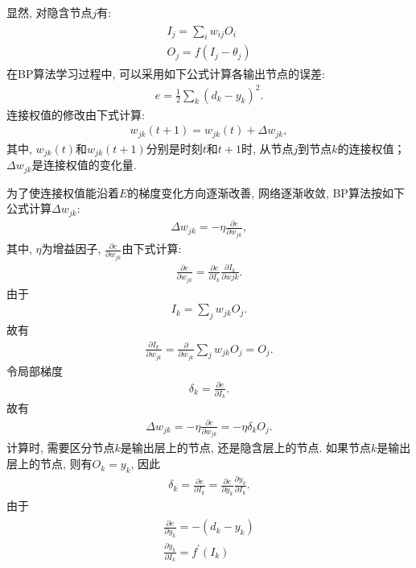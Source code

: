 显然, 对隐含节点$j$有:
\begin{align*}
  \begin{array}{l}
   {I_{j}=\sum_{i} w_{i j} O_{i}} \\
  {O_{j}=f\left(I_{j}-\theta_{j}\right)}
  \end{array}
\end{align*}
在BP算法学习过程中, 可以采用如下公式计算各输出节点的误差:
\begin{align*}
  e=\frac{1}{2} \sum_{k}\left(d_{k}-y_{k}\right)^{2}.
\end{align*}
连接权值的修改由下式计算:
\begin{align*}
  w_{j k}(t+1)=w_{j k}(t)+\Delta w_{j k},
\end{align*}
其中, $w_{jk}(t)$和$w_{jk}(t+1)$分别是时刻$t$和$t+1$时, 从节点$j$到节点$k$的连接权值；$\Delta w_{jk}$是连接权值的变化量.

为了使连接权值能沿着$E$的梯度变化方向逐渐改善, 网络逐渐收敛, BP算法按如下公式计算$\Delta w_{jk}$:
\begin{align*}
  \Delta w_{j k}=-\eta \frac{\partial e}{\partial w_{j k}},
\end{align*}
其中, $\eta$为增益因子, $\frac{\partial e}{\partial w_{j k}}$由下式计算:
\begin{align*}
  \frac{\partial e}{\partial w_{j k}}=\frac{\partial e}{\partial I_{k}} \frac{\partial I_{k}}{\partial w j k}.
\end{align*}
由于
\begin{align*}
  I_{k}=\sum_{j} w_{j k} O_{j}.
\end{align*}
故有
\begin{align*}
  \frac{\partial I_{k}}{\partial w_{j k}}=\frac{\partial}{\partial w_{j k}} \sum_{j} w_{j k} O_{j}=O_{j}.
\end{align*}
令局部梯度
\begin{align*}
  \delta_{k}=\frac{\partial e}{\partial I_{k}}.
\end{align*}
故有
\begin{align*}
  \Delta w_{j k}=-\eta \frac{\partial e}{\partial w_{j k}}=-\eta \delta_{k} O_{j}.
\end{align*}
 计算时, 需要区分节点$k$是输出层上的节点, 还是隐含层上的节点. 如果节点$k$是输出层上的节点, 则有$O_k=y_k$, 因此
\begin{align*}
  \delta_{k}=\frac{\partial e}{\partial I_{k}}=\frac{\partial e}{\partial y_{k}} \frac{\partial y_{k}}{\partial I_{k}}.
\end{align*}
由于
\begin{align*}
\begin{array}{l}
{\frac{\partial e}{\partial y_{k}}=-\left(d_{k}-y_{k}\right)} \\
{\frac{\partial y_{k}}{\partial I_{k}}=f^{\prime}\left(I_{k}\right)}
\end{array}
\end{align*}

